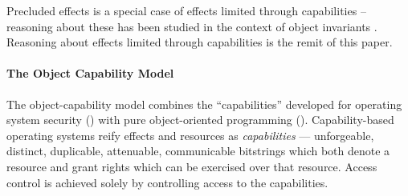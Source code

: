 \vspace{.1cm}
 
\noindent
Precluded effects is a special case of effects limited through capabilities -- reasoning about these 
has been studied in the context of object invariants   \cite{staticsfull,DrossoFrancaMuellerSummers08,BarDelFahLeiSch04,objInvars,MuellerPoetzsch-HeffterLeavens06}. 
{Reasoning about effects limited  through capabilities is the remit of this paper.}
  
 


 
 
\paragraph{The Object Capability Model}


The object-capability model combines the ``capabilities'' developed
for operating system security 
(\cite{levy:capabilities,CAP}) with pure object-oriented
programming
(\cite{selfpower,selfexp95,agha_actors_1987}).  Capability-based
operating systems reify effects and resources 
as \textit{capabilities} ---
unforgeable, distinct, duplicable, attenuable, communicable bitstrings
which both denote a resource and grant rights which can be exercised
over that resource. Access control is achieved
solely by controlling access to the capabilities.


